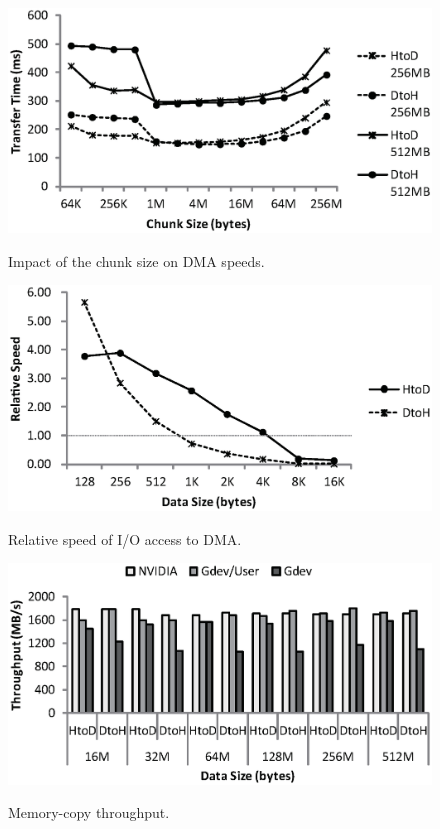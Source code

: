 \begin{figure}[t]
 \begin{center}
  \includegraphics[width=0.8\hsize]{eps/chunk.eps}\\
  \vspace{-1.5em}
  \caption{Impact of the chunk size on DMA speeds.}
  \label{fig:chunk}
 \end{center}
 \vspace{-1.5em}
 \begin{center}
  \includegraphics[width=0.8\hsize]{eps/dma.eps}\\
  \vspace{-1.5em}
  \caption{Relative speed of I/O access to DMA.}
  \label{fig:io_access}
 \end{center}
 \vspace{-1.5em}
 \begin{center}
  \includegraphics[width=0.9\hsize]{eps/memcpy.eps}\\
  \vspace{-1.5em}
  \caption{Memory-copy throughput.}
  \label{fig:memcpy}
 \end{center}
 \vspace{-1.5em}
\end{figure}

